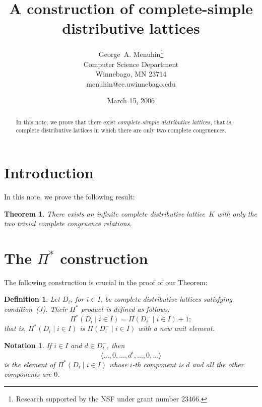 \documentclass{article}
\newtheorem{theorem}{Theorem}
\newtheorem{definition}{Definition}
\newtheorem{notation}{Notation}
\begin{document}
\title{A construction of complete-simple\\  
       distributive lattices}
\author{George~A. Menuhin\thanks{Research supported 
   by the NSF under grant number 23466.}\\
   Computer Science Department\\
   Winnebago, MN 23714\\
   menuhin@cc.uwinnebago.edu} 
\date{March 15, 2006}
\maketitle

\begin{abstract}
   In this note, we prove that there exist \emph{complete-simple
   distributive lattices,} that is, complete distributive 
   lattices in which there are only two complete congruences. 
\end{abstract}

\section{Introduction}\label{S:intro} 
In this note, we prove the following result:

\begin{theorem} 
   There exists an infinite complete distributive lattice~$K$
   with only the two trivial complete congruence relations.
\end{theorem}

\section{The $\Pi^{*}$ construction}\label{S:P*} 
The following construction is crucial in the proof of our Theorem:

\begin{definition}\label{D:P*} 
   Let $D_{i}$, for $i \in I$, be complete distributive 
   lattices satisfying condition~\textup{(J)}.  Their 
   $\Pi^{*}$ product is defined as follows:
   \[
      \Pi^{*} ( D_{i} \mid i \in I ) = 
       \Pi ( D_{i}^{-} \mid i \in I ) + 1;
   \]
   that is, $\Pi^{*} ( D_{i} \mid i \in I )$ is 
   $\Pi ( D_{i}^{-} \mid i \in I )$ with a new unit element. 
\end{definition}

\begin{notation}
   If $i \in I$ and $d \in D_{i}^{-}$, then
   \[
      \langle \ldots, 0, \ldots, d^i, \ldots, 0, \ldots \rangle
   \]
   is the element of $\Pi^{*} ( D_{i} \mid i \in I )$ whose 
   $i$-th component is $d$ and all the other components 
   are $0$.
\end{notation}
\end{document}
